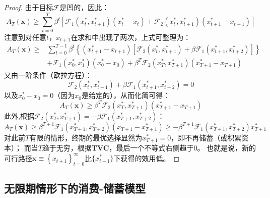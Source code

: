 \begin{proof}
    由于目标$\mathcal{F}$是凹的，因此：
    \begin{equation*}
        A_T(\mathbf{x}) \geq 
            \sum_{t=0}^T \beta^t
            \left[\mathcal{F}_1\left(x_t^*, x_{t+1}^*\right)\left(x_t^*-x_t\right)
                +\mathcal{F}_2\left(x_t^*, x_{t+1}^*\right)\left(x_{t+1}^*-x_{t+1}\right)\right]
    \end{equation*}
    注意到对任意$t$，$x_{t+1}$在求和中出现了两次，上式可整理为：
    \begin{equation*}
        \begin{aligned}
            A_T(\mathbf{x}) \geq & \sum_{t=0}^{T-1} \beta^t
            \left\{\left(x_{t+1}^*-x_{t+1}\right)\left[\mathcal{F}_2\left(x_t^*, x_{t+1}^*\right)
                +\beta \mathcal{F}_1\left(x_{t+1}^*, x_{t+2}^*\right)\right]\right\} \\
            & +\mathcal{F}_1\left(x_0^*, x_1^*\right)\left(x_0^*-x_0\right)
                + \beta^T \mathcal{F}_2\left(x_T^*, x_{T+1}^*\right)\left(x_{T+1}^*-x_{T+1}\right)
        \end{aligned}
    \end{equation*}
    又由一阶条件（欧拉方程）：
    \begin{equation*}
        \mathcal{F}_2\left(x_t^*,x_{t+1}^*\right)+\beta\mathcal{F}_1\left(x_{t+1}^*,x_{t+2}^*\right)=0
    \end{equation*}
    以及$x_0^*-x_0=0$（因为$x_0$是给定的），从而化简可得：
    \begin{equation*}
        A_T(\mathbf{x}) \geq \beta^T \mathcal{F}_2\left(x_T^*, x_{T+1}^*\right)\left(x_{T+1}^*-x_{T+1}\right)
    \end{equation*}
    此外,根据$\mathcal{F}_2\left(x_T^*,x_{T+1}^*\right) = - \beta\mathcal{F}_1\left(x_{T+1}^*,x_{T+2}^*\right)$：
    \begin{equation*}
        A_T(\mathbf{x}) \geq \beta^{T+1} \mathcal{F}_1\left(x_{T+1}^*, x_{T+2}^*\right)\left(x_{T+1}-x_{T+1}^*\right) 
            \geq-\beta^{T+1} \mathcal{F}_1\left(x_{T+1}^*, x_{T+2}^*\right) x_{T+1}^*
    \end{equation*}
    对此前$T$有限的情形，终期的最优选择显然为$x_{T+1}^*=0$，即不再储蓄（或积累资本）；
    而当$T$趋于无穷，根据\textbf{TVC}，最后一个不等式右侧趋于0。
    也就是说，新的可行路径$\mathbf{x} \equiv\left\{x_{t+1}\right\}_{t=0}^{\infty}$比$\{x_{t+1}^*\}$下获得的效用低。
\end{proof}


\subsection{无限期情形下的消费-储蓄模型}

